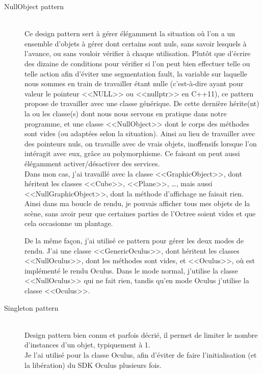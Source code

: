 \documentclass[a4paper,french,12pt]{article}
\begin{document}
	    \begin{description}
	    \item [NullObject pattern]~\\
		Ce design pattern sert à gérer élégamment la situation où l'on a un ensemble d'objets à gérer dont certains sont
		nuls, sans savoir lesquels à l'avance, ou sans vouloir vérifier à chaque utilisation. Plutôt que d'écrire des dizaine de conditions pour vérifier si l'on peut bien effectuer telle ou telle action
		afin d'éviter une segmentation fault, la variable sur laquelle nous sommes en train de travailler
		étant nulle (c'est-à-dire ayant pour valeur le pointeur <<NULL>> ou <<nullptr>> en C++11),
		ce pattern propose de travailler avec une classe générique. De cette dernière hérite(nt) la ou les classe(s) dont nous nous
		servons en pratique dans notre programme, et une classe <<NullObject>> dont le corps des méthodes sont vides (ou
		adaptées selon la situation).
		Ainsi au lieu de travailler avec des pointeurs nuls, on travaille avec de vrais objets, inoffensifs lorsque
		l'on intéragit avec eux, grâce au polymorphisme.
		Ce faisant on peut aussi élégamment activer/désactiver des services.\\
		
		Dans mon cas, j'ai travaillé avec la classe <<GraphicObject>>, dont héritent les classes <<Cube>>, <<Plane>>, \ldots,
		mais aussi <<NullGraphicObject>>, dont la méthode d'affichage ne faisait rien.
		Ainsi dans ma boucle de rendu, je pouvais afficher tous mes objets de la scène, sans avoir peur que certaines parties
		de l'Octree soient vides et que cela occasionne un plantage.
		
		
		De la même façon, j'ai utilisé ce pattern pour gérer les deux modes de rendu. J'ai une classe <<GenericOculus>>,
		dont héritent les classes <<NullOculus>>, dont les méthodes sont vides, et <<Oculus>>, où est implémenté
		le rendu Oculus. Dans le mode normal, j'utilise la classe <<NullOculus>> qui ne fait rien, tandis qu'en mode
		Oculus j'utilise la classe <<Oculus>>.

	    \item [Singleton pattern]~\\
		Design pattern bien connu et parfois décrié, il permet de limiter le nombre d'instances d'un objet, typiquement
		à 1.\\
		
		Je l'ai utilisé pour la classe Oculus, afin d'éviter de faire l'initialisation (et la libération) du SDK Oculus plusieurs fois.
		

\end{description}
\end{document}
